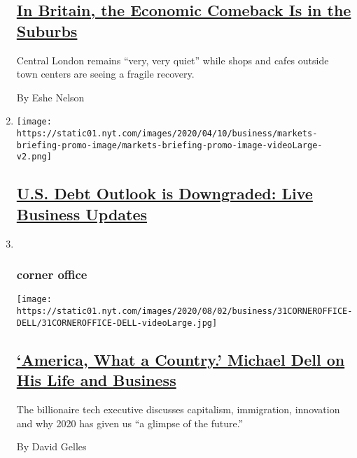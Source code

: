\begin{enumerate}
  \hypertarget{in-britain-the-economic-comeback-is-in-the-suburbs}{%
  \subsection{\texorpdfstring{\href{/2020/07/31/business/britain-economic-comeback-suburbs.html}{In
  Britain, the Economic Comeback Is in the
  Suburbs}}{In Britain, the Economic Comeback Is in the Suburbs}}\label{in-britain-the-economic-comeback-is-in-the-suburbs}}

  Central London remains ``very, very quiet'' while shops and cafes
  outside town centers are seeing a fragile recovery.

  By Eshe Nelson
\item
  \texttt{[image: https://static01.nyt.com/images/2020/04/10/business/markets-briefing-promo-image/markets-briefing-promo-image-videoLarge-v2.png]}

  \hypertarget{us-debt-outlook-is-downgraded-live-business-updates}{%
  \subsection{\texorpdfstring{\href{https://www.nytimes.com/live/2020/07/31/business/stock-market-today-coronavirus}{U.S.
  Debt Outlook is Downgraded: Live Business
  Updates}}{U.S. Debt Outlook is Downgraded: Live Business Updates}}\label{us-debt-outlook-is-downgraded-live-business-updates}}
\item ~
  \hypertarget{corner-office}{%
  \subsubsection{corner office}\label{corner-office}}

  \texttt{[image: https://static01.nyt.com/images/2020/08/02/business/31CORNEROFFICE-DELL/31CORNEROFFICE-DELL-videoLarge.jpg]}

  \hypertarget{america-what-a-country-michael-dell-on-his-life-and-business}{%
  \subsection{\texorpdfstring{\href{/2020/07/31/business/michael-dell-corner-office.html}{`America,
  What a Country.' Michael Dell on His Life and
  Business}}{`America, What a Country.' Michael Dell on His Life and Business}}\label{america-what-a-country-michael-dell-on-his-life-and-business}}

  The billionaire tech executive discusses capitalism, immigration,
  innovation and why 2020 has given us ``a glimpse of the future.''

  By David Gelles
\end{enumerate}

